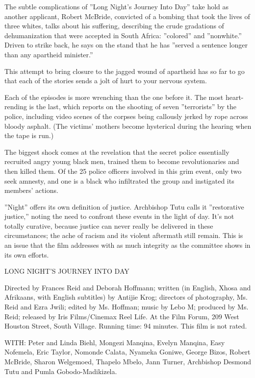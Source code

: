 The subtle complications of ''Long Night's Journey Into Day'' take hold
as another applicant, Robert McBride, convicted of a bombing that took
the lives of three whites, talks about his suffering, describing the
crude gradations of dehumanization that were accepted in South Africa:
''colored'' and ''nonwhite.'' Driven to strike back, he says on the
stand that he has ''served a sentence longer than any apartheid
minister.''

This attempt to bring closure to the jagged wound of apartheid has so
far to go that each of the stories sends a jolt of hurt to your nervous
system.

Each of the episodes is more wrenching than the one before it. The most
heart-rending is the last, which reports on the shooting of seven
''terrorists'' by the police, including video scenes of the corpses
being callously jerked by rope across bloody asphalt. (The victims'
mothers become hysterical during the hearing when the tape is run.)

The biggest shock comes at the revelation that the secret police
essentially recruited angry young black men, trained them to become
revolutionaries and then killed them. Of the 25 police officers involved
in this grim event, only two seek amnesty, and one is a black who
infiltrated the group and instigated its members' actions.

''Night'' offers its own definition of justice. Archbishop Tutu calls it
''restorative justice,'' noting the need to confront these events in the
light of day. It's not totally curative, because justice can never
really be delivered in these circumstances; the ache of racism and its
violent aftermath still remain. This is an issue that the film addresses
with as much integrity as the committee shows in its own efforts.

LONG NIGHT'S JOURNEY INTO DAY

Directed by Frances Reid and Deborah Hoffmann; written (in English,
Xhosa and Afrikaans, with English subtitles) by Antijie Krog; directors
of photography, Ms. Reid and Ezra Jwili; edited by Ms. Hoffman; music by
Lebo M; produced by Ms. Reid; released by Iris Films/Cinemax Reel Life.
At the Film Forum, 209 West Houston Street, South Village. Running time:
94 minutes. This film is not rated.

WITH: Peter and Linda Biehl, Mongezi Manqina, Evelyn Manqina, Easy
Nofemela, Eric Taylor, Nomonde Calata, Nyameka Goniwe, George Bizos,
Robert McBride, Sharon Welgemoed, Thapelo Mbelo, Jann Turner, Archbishop
Desmond Tutu and Pumla Gobodo-Madikizela.

